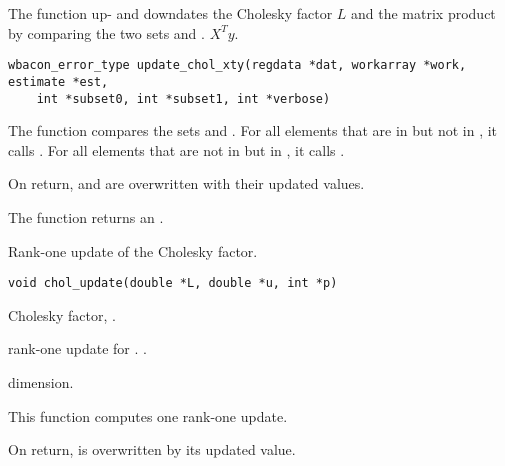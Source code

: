 \documentclass[a4paper,oneside,10pt,DIV=12]{scrreprt}
\begin{document}
\begin{Description}
The function up- and downdates the Cholesky factor $L$ and the matrix product
by comparing the two sets  and .
$X^Ty$. 
\end{Description}
\begin{Usage}
\begin{verbatim}
wbacon_error_type update_chol_xty(regdata *dat, workarray *work, estimate *est, 
    int *subset0, int *subset1, int *verbose)
\end{verbatim}
\end{Usage}
\begin{Arguments}
	\begin{ldescription}
		\REGDATA
		\WORKreg
		\EST
		\SUBSETSIZEm
		\VERBOSE
	\end{ldescription}
\end{Arguments}
\begin{Details}
The function  compares the sets  and
. For all elements that are in  but not in
, it calls . For all
elements that are not in  but in , it calls 
.
\end{Details}
\begin{Value}
On return,  and  are overwritten with their updated values.

The function returns an .
\end{Value}

\begin{Description}
Rank-one update of the Cholesky factor.
\end{Description}
\begin{Usage}
\begin{verbatim}
void chol_update(double *L, double *u, int *p)
\end{verbatim}
\end{Usage}
\begin{Arguments}
	\begin{ldescription}
		\item[\code{L}] Cholesky factor, \code{double array[p, p]}.
		\item[\code{u}] rank-one update for \code{L}.
			\code{double array[p]}.
		\item[\code{p}] dimension.
	\end{ldescription}
\end{Arguments}
\begin{Details}
This function computes one rank-one update. 
\end{Details}
\begin{Value}
On return,  is overwritten by its updated value.
\end{Value}
\end{document}
